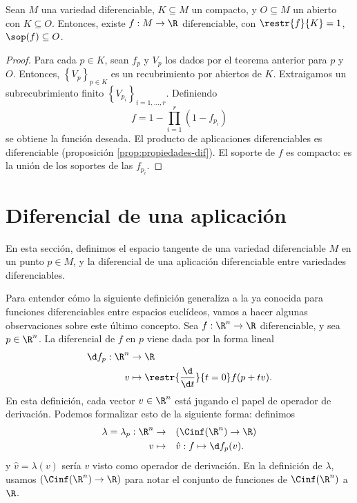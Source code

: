 \begin{ncor}
  Sean $M$ una variedad diferenciable, $K\subseteq M$ un compacto, y $O\subseteq
  M$ un abierto con $K\subseteq O$. Entonces, existe $f:M\to\R$ diferenciable,
  con $\restr{f}{K} = 1$, $\sop(f)\subseteq O$.
\end{ncor}
\begin{proof}
  Para cada $p\in K$, sean $f_{p}$ y $V_{p}$ los dados por el teorema anterior
  para $p$ y $O$. Entonces, $\left\{ V_{p} \right\}_{p\in K}$ es un
  recubrimiento por abiertos de $K$. Extraigamos un subrecubrimiento finito
  $\left\{ V_{p_{i}} \right\}_{i=1,\dots,r}$. Definiendo
  \[
    f = 1 - \prod_{i=1}^{r}(1-f_{p_{i}})
  \]
  se obtiene la función deseada. El producto de aplicaciones diferenciables es
  diferenciable (proposición \ref{prop:propiedades-dif}). El soporte de $f$ es
  compacto: es la unión de los soportes de las $f_{p_{i}}$.
\end{proof}

\section{Diferencial de una aplicación}

En esta sección, definimos el espacio tangente de una variedad diferenciable $M$
en un punto $p\in M$, y la diferencial de una aplicación diferenciable entre
variedades diferenciables.

Para entender cómo la siguiente definición generaliza a la ya conocida para
funciones diferenciables entre espacios euclídeos, vamos a hacer algunas
observaciones sobre este último concepto. Sea $f:\R^{n}\to\R$ diferenciable, y
sea $p\in\R^{n}$. La diferencial de $f$ en $p$ viene dada por la forma lineal
\begin{alignat*}{2}
  \d f_{p}: \R^{n} & \to \R \\
  v & \mapsto \restr{\frac{\d}{\d t}}{t = 0}f(p+tv).
\end{alignat*}
En esta definición, cada vector $v\in \R^{n}$ está jugando el papel de operador
de derivación. Podemos formalizar esto de la siguiente forma: definimos
\begin{alignat*}{3}
  \lambda = \lambda_{p}: \R^{n} & \to && (\Cinf(\R^{n})\to\R)   \\
               v & \mapsto && \hat{v}: f \mapsto \d f_{p}(v).
\end{alignat*}
y $\hat{v} = \lambda(v)$ sería $v$ visto como operador de derivación. En la
definición de $\lambda$, usamos $(\Cinf(\R^{n})\to\R)$ para notar el conjunto de
funciones de $\Cinf(\R^{n})$ a $\R$.

